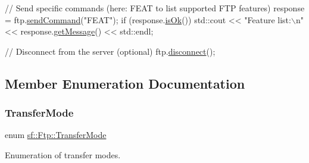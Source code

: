 \begin{DoxyCode}
\textcolor{comment}{// Send specific commands (here: FEAT to list supported FTP features)}
response = ftp.\hyperlink{classsf_1_1_ftp_a44e095103ecbce175a33eaf0820440ff}{sendCommand}(\textcolor{stringliteral}{"FEAT"});
\textcolor{keywordflow}{if} (response.\hyperlink{classsf_1_1_ftp_1_1_response_a5102552955a2652c1a39e9046e617b36}{isOk}())
    std::cout << \textcolor{stringliteral}{"Feature list:\(\backslash\)n"} << response.\hyperlink{classsf_1_1_ftp_1_1_response_a4af82a0b3620c90558390e1f600abc05}{getMessage}() << std::endl;

\textcolor{comment}{// Disconnect from the server (optional)}
ftp.\hyperlink{classsf_1_1_ftp_acf7459926f3391cd06bf84337ed6a0f4}{disconnect}();
\end{DoxyCode}
 

\subsection{Member Enumeration Documentation}
\mbox{\label{classsf_1_1_ftp_a1cd6b89ad23253f6d97e6d4ca4d558cb}} 
\subsubsection{\texorpdfstring{Transfer\+Mode}{TransferMode}}
{\footnotesize\ttfamily enum \hyperlink{classsf_1_1_ftp_a1cd6b89ad23253f6d97e6d4ca4d558cb}{sf\+::\+Ftp\+::\+Transfer\+Mode}}



Enumeration of transfer modes. 

